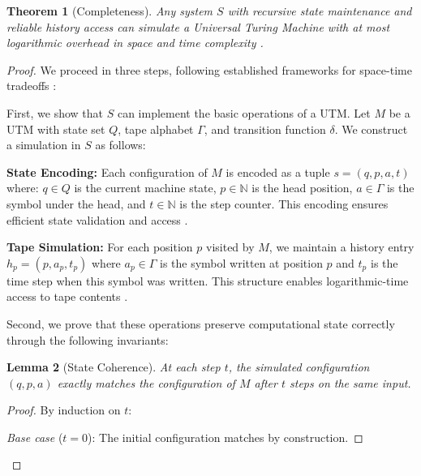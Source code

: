 \documentclass[12pt]{article}
\newtheorem{theorem}{Theorem}
\newtheorem{lemma}[theorem]{Lemma}
\begin{document}
\vspace{1em}

\begin{theorem}[Completeness]
Any system $S$ with recursive state maintenance and reliable history access can simulate a Universal Turing Machine with at most logarithmic overhead in space and time complexity \cite{boyle2024memory,liskiewicz1994complexity}.
\end{theorem}

\begin{proof}
We proceed in three steps, following established frameworks for space-time tradeoffs \cite{swamy1983space,hu2014computational}:

First, we show that $S$ can implement the basic operations of a UTM. Let $M$ be a UTM with state set $Q$, tape alphabet $\Gamma$, and transition function $\delta$. We construct a simulation in $S$ as follows:

\vspace{0.5em}
\noindent\textbf{State Encoding:} Each configuration of $M$ is encoded as a tuple $s = (q, p, a, t)$ where: $q \in Q$ is the current machine state, $p \in \mathbb{N}$ is the head position, $a \in \Gamma$ is the symbol under the head, and $t \in \mathbb{N}$ is the step counter.
This encoding ensures efficient state validation and access \cite{boyle2024memory,hu2014computational}.

\vspace{0.5em}
\noindent\textbf{Tape Simulation:} For each position $p$ visited by $M$, we maintain a history entry $h_p = (p, a_p, t_p)$ where $a_p \in \Gamma$ is the symbol written at position $p$ and $t_p$ is the time step when this symbol was written.
This structure enables logarithmic-time access to tape contents \cite{swamy1983space,liskiewicz1994complexity}.

Second, we prove that these operations preserve computational state correctly through the following invariants:

\begin{lemma}[State Coherence]
At each step $t$, the simulated configuration $(q, p, a)$ exactly matches the configuration of $M$ after $t$ steps on the same input.
\end{lemma}

\begin{proof}
By induction on $t$:

\vspace{0.3em}
\noindent\textit{Base case} ($t=0$): The initial configuration matches by construction.


\end{proof}
\end{proof}
\end{document}
